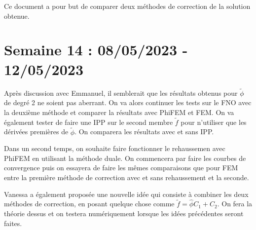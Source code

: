 \documentclass[french]{article}
\begin{document}
	Ce document a pour but de comparer deux méthodes de correction de la solution obtenue.
\section{Semaine 14 : 08/05/2023 - 12/05/2023}
	Après discussion avec Emmanuel, il semblerait que les résultats obtenus pour $\tilde{\phi}$ de degré 2 ne soient pas aberrant. On va alors continuer les tests sur le FNO avec la deuxième méthode et comparer la résultats avec PhiFEM et FEM.  On va également tester de faire une IPP sur le second membre $\tilde{f}$ pour n'utiliser que les dérivées premières de $\tilde{\phi}$. On comparera les résultats avec et sans IPP.

	Dans un second temps, on souhaite faire fonctionner le rehaussemen avec PhiFEM en utilisant la méthode duale. On commencera par faire les courbes de convergence puis on essayera de faire les mêmes comparaisons que pour FEM entre la première méthode de correction avec et sans rehaussement et la seconde.
	
	Vanessa a également proposée une nouvelle idée qui consiste à combiner les deux méthodes de correction, en posant quelque chose comme $\tilde{f}=\hat{\phi}C_1+C_2$. On fera la théorie dessus et on testera numériquement lorsque les idées précédentes seront faites.
\end{document}

